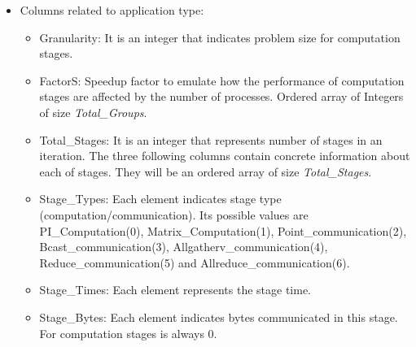 \begin{itemize}
\begin{itemize}
        \item Redistribution\_Strategy: Redistribution strategy for each resize. Array of integers with size \textit{Total\_Groups}. Its possible values are None(1), Threads(2).
        \item SDR: Number of data elements redistributed synchronously in each redistribution stage. Integer. Multiply by \texttt{Datasize} for bytes moved.
        \item ADR: Number of data elements redistributed asynchronously in each redistribution stage. Integer. Multiply by \texttt{Datasize} for bytes moved.
        \item DR: Total elements redistributed in each redistribution stage. Is equal to $SDR + ADR$. Integer.
    \end{itemize}
    
    \item Columns related to application type: %
    \begin{itemize}
        \item Granularity: It is an integer that indicates problem size for computation stages. %
        \item FactorS: Speedup factor to emulate how the performance of computation stages are affected by the number of processes. Ordered array of Integers of size \textit{Total\_Groups}.
        \item Total\_Stages: It is an integer that represents number of stages in an iteration. The three following columns contain concrete information about each of stages. They will be an ordered array of size \textit{Total\_Stages}.
        \item Stage\_Types: Each element indicates stage type (computation/communication). %
        Its possible values are PI\_Computation(0), Matrix\_Computation(1), Point\_communication(2), Bcast\_communication(3), Allgatherv\_communication(4), Reduce\_communication(5) and Allreduce\_communication(6).
        \item Stage\_Times: Each element represents the stage time. %
        \item Stage\_Bytes: Each element indicates bytes communicated in this stage. %
        For computation stages is always 0.
    \end{itemize}
    

\end{itemize}
